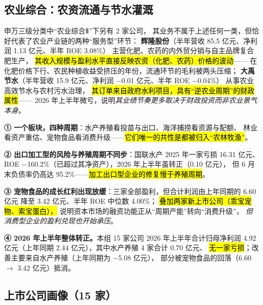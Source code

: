\subsection{农业综合：农资流通与节水灌溉}
\label{sec:fishery-misc}

申万三级分类中“农业综合Ⅱ”下另有 \num{2} 家公司，
其业务不属于上述任何一类，但恰好代表了农业产业链的两种“服务型”环节：
\textbf{辉隆股份}（半年营收 \num{85.5} 亿元、净利润 \num{1.13} 亿元、半年 ROE \num{3.08}\%）
主营化肥、农药的内外贸分销与自主品牌复合肥生产，
\hl{其收入规模与盈利水平直接反映农资（化肥、农药）价格的波动}——
在化肥价格下行、农民种植收益受挤压的年份，流通环节的毛利被两头压缩；
\textbf{大禹节水}（半年营收 \num{15.9} 亿元、净利润 \num{-0.01} 亿元、半年 ROE \num{-0.04}\%）
从事农业高效节水与农村污水治理，
\hl{其订单来自政府水利项目，具有“逆农业周期”的财政属性}——
2026 年上半年微亏，说明\emph{其业绩节奏更多取决于财政投资而非农业景气本身}。



\begin{keybox}[渔业、林业与宠物食品的画像结论]
\normalsize
\textbf{① 一个板块，四种周期}：水产养殖看投苗与出口、海洋捕捞看资源与配额、
林业看资产重估、宠物食品看消费升级——\hl{它们唯一的共性是都被归入“农林牧渔”}。\par\vspace{3pt}
\textbf{② 出口加工型的风险与养殖周期不同步}：国联水产 2025 年一家亏损 \num{16.31} 亿元、
ROE \num{-160.2}\%（已超过其净资产），2026 年上半年虽转正（\num{0.10} 亿元），
但 6 月末负债率仍高达 \num{95.2}\%——\hl{加工出口型企业的修复慢于养殖周期}。\par\vspace{3pt}
\textbf{③ 宠物食品的成长红利出现放缓}：三家全部盈利，但合计利润由上年同期的 \num{6.60} 亿元
降至 \num{3.42} 亿元、半年 ROE 中位数 \num{4.00}\%；
\hl{叠加两家新上市公司（乖宝宠物、索宝蛋白），}
说明资本市场的融资功能正从“周期产能”转向“消费升级”，
\emph{但消费型企业的盈利兑现也开始承压}。\par\vspace{3pt}
\textbf{④ 2026 年上半年整体转正。}本组 \num{15} 家公司 2026 年上半年合计归母净利润
\num{4.92} 亿元（上年同期 \num{2.44} 亿元），其中水产养殖 \num{4} 家合计 \num{0.70} 亿元、
\hl{无一家亏损}；改善主要来自水产养殖（上年同期为 \num{-5.08} 亿元），
部分被宠物食品的回落（\num{6.60} $\to$ \num{3.42} 亿元）抵消。
\end{keybox}

\subsection{上市公司画像（\num{15} 家）}
\label{sec:co-fishery}

